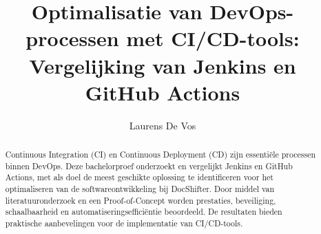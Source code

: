 \documentclass[a0,portrait]{hogent-poster}
\title{Optimalisatie van DevOps-processen met CI/CD-tools: Vergelijking van Jenkins en GitHub Actions}
\subtitle{}
\author{Laurens De Vos}
\begin{document}
    
    \maketitle
    
    \begin{abstract}
        Continuous Integration (CI) en Continuous Deployment (CD) zijn essentiële processen binnen DevOps. Deze bachelorproef onderzoekt en vergelijkt Jenkins en GitHub Actions, met als doel de meest geschikte oplossing te identificeren voor het optimaliseren van de softwareontwikkeling bij DocShifter. Door middel van literatuuronderzoek en een Proof-of-Concept worden prestaties, beveiliging, schaalbaarheid en automatiseringsefficiëntie beoordeeld. De resultaten bieden praktische aanbevelingen voor de implementatie van CI/CD-tools.
    \end{abstract}
    
\end{document}

